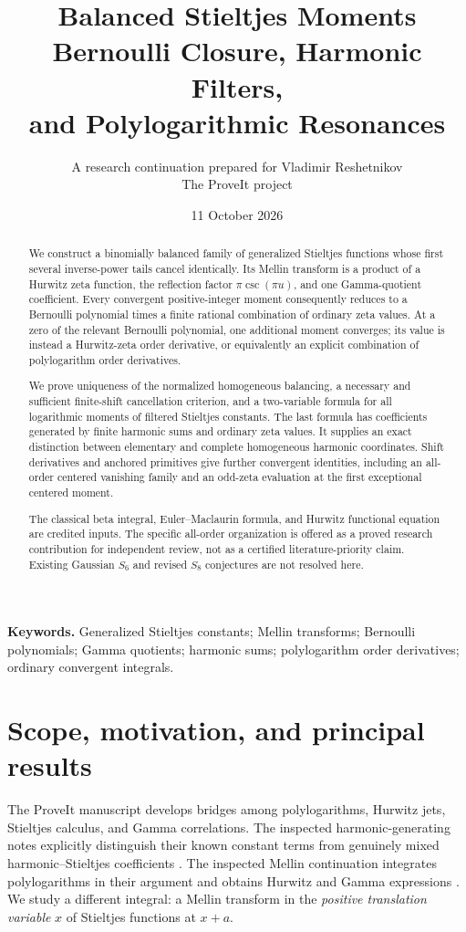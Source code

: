 \documentclass[11pt,letterpaper]{article}
\title{\textbf{Balanced Stieltjes Moments}\\[5pt]
\large Bernoulli Closure, Harmonic Filters,\\and Polylogarithmic Resonances}
\author{A research continuation prepared for Vladimir Reshetnikov\\
\small The ProveIt project}
\date{11 October 2026}
\numberwithin{equation}{section}
\theoremstyle{definition}\newtheorem{definition}[theorem]{Definition}
\theoremstyle{remark}\newtheorem{remark}[theorem]{Remark}
\begin{document}
\maketitle
\begin{abstract}
We construct a binomially balanced family of generalized Stieltjes functions
whose first several inverse-power tails cancel identically. Its Mellin
transform is a product of a Hurwitz zeta function, the reflection factor
$\pi\csc(\pi u)$, and one Gamma-quotient coefficient. Every convergent
positive-integer moment consequently reduces to a Bernoulli polynomial
times a finite rational combination of ordinary zeta values. At a zero
of the relevant Bernoulli polynomial, one additional moment converges;
its value is instead a Hurwitz-zeta order derivative, or equivalently an
explicit combination of polylogarithm order derivatives.

We prove uniqueness of the normalized homogeneous balancing, a necessary
and sufficient finite-shift cancellation criterion, and a two-variable
formula for all logarithmic moments of filtered Stieltjes constants.
The last formula has coefficients generated by finite harmonic sums and
ordinary zeta values. It supplies an exact distinction between elementary
and complete homogeneous harmonic coordinates. Shift derivatives and
anchored primitives give further convergent identities, including an
all-order centered vanishing family and an odd-zeta evaluation at the
first exceptional centered moment.

The classical beta integral, Euler--Maclaurin formula, and Hurwitz
functional equation are credited inputs. The specific all-order
organization is offered as a proved research contribution for independent
review, not as a certified literature-priority claim. Existing Gaussian
$S_6$ and revised $S_8$ conjectures are not resolved here.
\end{abstract}
\vspace{4pt}
\noindent\textbf{Keywords.} Generalized Stieltjes constants; Mellin transforms;
Bernoulli polynomials; Gamma quotients; harmonic sums; polylogarithm order
derivatives; ordinary convergent integrals.
\clearpage
{\setlength{\parskip}{0pt}\small\tableofcontents}
\clearpage

\section{Scope, motivation, and principal results}\label{bsm:sec:scope}

The ProveIt manuscript develops bridges among polylogarithms, Hurwitz
jets, Stieltjes calculus, and Gamma correlations. The inspected
harmonic-generating notes explicitly distinguish their known constant
terms from genuinely mixed harmonic--Stieltjes coefficients
\cite{RepoHarmonic,RepoQuestions}. The inspected Mellin continuation
integrates polylogarithms in their argument and obtains Hurwitz and
Gamma expressions \cite{RepoMellin}. We study a different integral:
a Mellin transform in the \emph{positive translation variable} $x$ of
Stieltjes functions at $x+a$.
\end{document}
